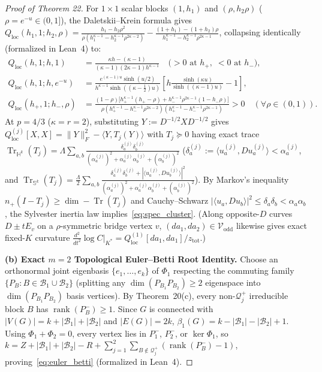 \documentclass[10pt,letterpaper]{article}
\newcommand{\Tr}{\operatorname{Tr}}
\newcommand{\rank}{\operatorname{rank}}
\begin{document}
\begin{proof}[Proof of Theorem 22]
For $1\times 1$ scalar blocks $(1, h_1)$ and $(\rho, h_2\rho)$ ($\rho = e^{-u} \in (0, 1]$), the Daletskii--Krein formula gives $Q_{\mathrm{loc}}(h_1, 1; h_2, \rho) = \frac{h_1 - h_2\rho^2}{\rho(h_1^{\kappa-1} - h_2^{\kappa-1}\rho^{2\kappa-2})} - \frac{(1+h_1)-(1+h_2)\rho}{h_1^{\kappa-1}-h_2^{\kappa-1}\rho^{2\kappa-1}}$, collapsing identically (formalized in Lean~4) to:
\begin{align*}
  Q_{\mathrm{loc}}(h, 1; h, 1) &= \frac{\kappa h - (\kappa - 1)}{(\kappa-1)(2\kappa-1)h^{\kappa-1}} \quad \bigl(> 0 \text{ at } h_+,\; < 0 \text{ at } h_-\bigr), \\
  Q_{\mathrm{loc}}(h, 1; h, e^{-u}) &= \frac{e^{(\kappa-1)u}\sinh(u/2)}{h^{\kappa-1}\sinh((\kappa-\tfrac{1}{2})u)}\!\left[h\frac{\sinh(\kappa u)}{\sinh((\kappa-1)u)} - 1\right], \\
  Q_{\mathrm{loc}}(h_+, 1; h_-, \rho) &= \frac{(1-\rho)\bigl[h_+^{\kappa-1}(h_+ - \rho) + h_-^{\kappa-1}\rho^{2\kappa-1}(1 - h_-\rho)\bigr]}{\rho(h_+^{\kappa-1} - h_-^{\kappa-1}\rho^{2\kappa-2})(h_+^{\kappa-1} - h_-^{\kappa-1}\rho^{2\kappa-1})} > 0 \quad (\forall \rho \in (0, 1)).
\end{align*}
At $p = 4/3$ ($\kappa = r = 2$), substituting $Y := D^{-1/2} X D^{-1/2}$ gives $Q_{\mathrm{loc}}^{(j)}[X, X] = \|Y\|_F^2 - \langle Y, T_j(Y)\rangle$ with $T_j \succeq 0$ having exact trace $\Tr_{\mathbb{H}^k}(T_j) = \Lambda\sum_{a,b}\frac{\delta_a^{(j)}\delta_b^{(j)}}{(\alpha_a^{(j)})^2 + \alpha_a^{(j)}\alpha_b^{(j)} + (\alpha_b^{(j)})^2}$ ($\delta_a^{(j)} := \langle u_a^{(j)}, D u_a^{(j)}\rangle < \alpha_a^{(j)}$, and $\Tr_{\mathbb{S}^k}(T_j) = \frac{\Lambda}{2}\sum_{a,b}\frac{\delta_a^{(j)}\delta_b^{(j)} + |\langle u_a^{(j)}, D u_b^{(j)}\rangle|^2}{(\alpha_a^{(j)})^2 + \alpha_a^{(j)}\alpha_b^{(j)} + (\alpha_b^{(j)})^2}$). By Markov's inequality $n_+(I - T_j) \ge \dim - \Tr(T_j)$ and Cauchy--Schwarz $|\langle u_a, D u_b\rangle|^2 \le \delta_a\delta_b < \alpha_a\alpha_b$, the Sylvester inertia law implies~\eqref{eq:spec_cluster}. (Along opposite-$D$ curves $D \pm t E_v$ on a $\rho$-symmetric bridge vertex $v$, $(da_1, da_2) \in \mathcal{V}_{\mathrm{odd}}$ likewise gives exact fixed-$K$ curvature $\frac{d^2}{dt^2}\log C|_{K^*} = Q_{\mathrm{loc}}^{(1)}[da_1, da_1]/z_{\mathrm{tot}}$.)

\textbf{(b) Exact $m = 2$ Topological Euler--Betti Root Identity.}
Choose an orthonormal joint eigenbasis $\{e_1,\dots,e_k\}$ of $\Phi_1$ respecting the commuting family $\{P_B : B \in \mathcal{B}_1 \cup \mathcal{B}_2\}$ (splitting any $\dim(P_{B_1}P_{B_2}) \ge 2$ eigenspace into $\dim(P_{B_1}P_{B_2})$ basis vertices). By Theorem~20(c), every non-$\mathcal{Q}_j^+$ irreducible block $B$ has $\rank(P_B^-) \ge 1$. Since $G$ is connected with $|V(G)| = k + |\mathcal{B}_1| + |\mathcal{B}_2|$ and $|E(G)| = 2k$, $\beta_1(G) = k - |\mathcal{B}_1| - |\mathcal{B}_2| + 1$. Using $\Phi_1 + \Phi_2 = 0$, every vertex lies in $P_1^-$, $P_2^-$, or $\ker\Phi_1$, so $k = Z + |\mathcal{B}_1| + |\mathcal{B}_2| - R + \sum_{j=1}^2\sum_{B \notin \mathcal{Q}_j^+}(\rank(P_B^-) - 1)$, proving~\eqref{eq:euler_betti} (formalized in Lean~4).


\end{proof}
\end{document}
